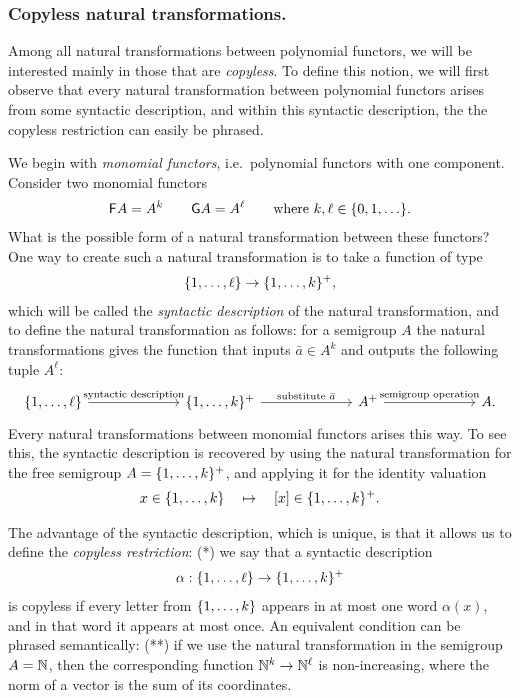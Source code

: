 \subsubsection{Copyless natural transformations.}  Among all natural  transformations between polynomial functors, we will be interested mainly in those that are  \emph{copyless}. To define this notion, we will first observe that  every natural transformation between polynomial functors  arises from some syntactic description, and within this syntactic description, the  the copyless restriction can easily be phrased. 

We begin with \emph{monomial functors}, i.e.~polynomial functors with one component. 
Consider two monomial functors 
\begin{align*}
\mathsf F A = A^k \qquad 
\mathsf G A = A^\ell \qquad \text{where $k,\ell \in \{0,1,\ldots\}$.}
\end{align*}
What is the possible form of a natural transformation between these functors? One way to create such a natural transformation is to take a  function  of type 
\begin{align*}
\{1,\ldots,\ell\} \to \{1,\ldots,k\}^+,
\end{align*}
which will be called the \emph{syntactic description} of the natural transformation, 
and to define the natural transformation as follows: for a semigroup $A$ the natural transformations gives the function  that inputs $\bar a \in A^k$ and outputs the following tuple $A^\ell$:
\[
\begin{tikzcd}
    [column sep=2.3cm]
\set{1,\ldots,\ell}
\arrow[r, "\text{syntactic description}"]
&
\set{1,\ldots,k}^+ 
\ar[r,"\text{substitute $\bar a$}"]
& 
A^+
\ar[r,"\text{semigroup operation}"]
&
A.
\end{tikzcd}
\]
Every natural transformations between monomial functors arises this way. To see this, the syntactic description is recovered by using the natural transformation for the free semigroup $A=\{1,\ldots,k\}^+$, and applying it for the identity valuation 
\begin{align*}
x \in \{1,\ldots,k\} \quad \mapsto \quad [x] \in \{1,\ldots,k\}^+.
\end{align*}


The advantage of the syntactic description, which is unique, is that it allows us to define the  \emph{copyless restriction}:  (*)   we say that a  syntactic description
\begin{align*}
    \alpha: \{1,\ldots,\ell\} \to \{1,\ldots,k\}^+
    \end{align*}
is copyless if  every letter  from $\{1,\ldots,k\}$ appears in at most one word $\alpha(x)$, and in that word it appears at most once. An equivalent condition can be phrased semantically: (**) if we use the natural transformation in the semigroup $A = {\mathbb N}$, then the corresponding function ${\mathbb N}^k \to {\mathbb N}^\ell$ is non-increasing, where the norm of a vector is the sum of its coordinates. 

